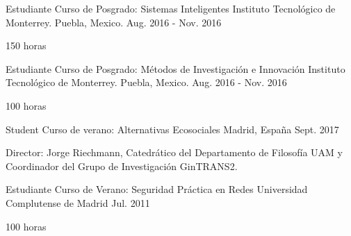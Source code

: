 \begin{cventries}
  \cventry
    {Estudiante} %
    {Curso de Posgrado: Sistemas Inteligentes} %
    {Instituto Tecnológico de Monterrey. Puebla, Mexico.} %
    {Aug. 2016 - Nov. 2016} %
    {
      \begin{cvitems} %
        \item {150 horas}
      \end{cvitems}
    }

  \cventry
    {Estudiante} %
    {Curso de Posgrado: Métodos de Investigación e Innovación} %
    {Instituto Tecnológico de Monterrey. Puebla, Mexico.} %
    {Aug. 2016 - Nov. 2016} %
    {
      \begin{cvitems} %
        \item {100 horas}
      \end{cvitems}
    }

  \cventry
    {Student} %
    {Curso de verano: Alternativas Ecosociales} %
    {Madrid, España} %
    {Sept. 2017} %
    {
      \begin{cvitems} %
        \item {Director: Jorge Riechmann, Catedrático del Departamento de Filosofía UAM y Coordinador del Grupo de Investigación GinTRANS2.}
      \end{cvitems}
    }

    
  \cventry
    {Estudiante} %
    {Curso de Verano: Seguridad Práctica en Redes} %
    {Universidad Complutense de Madrid} %
    {Jul. 2011} %
    {
      \begin{cvitems} %
        \item {100 horas}
      \end{cvitems}
    }
    
\end{cventries}


